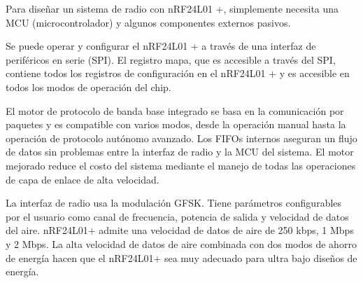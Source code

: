 		\par 
			Para diseñar un sistema de radio con nRF24L01 +, simplemente necesita una MCU (microcontrolador) y algunos componentes externos pasivos.
			
		\par 
			Se puede operar y configurar el nRF24L01 + a través de una interfaz de periféricos en serie (SPI). El registro
			mapa, que es accesible a través del SPI, contiene todos los registros de configuración en el nRF24L01 + y es
			accesible en todos los modos de operación del chip.
			
		\par 
			El motor de protocolo de banda base integrado se basa en la comunicación por paquetes
			y es compatible con varios modos, desde la operación manual hasta la operación de protocolo autónomo avanzado. 
			Los FIFOs internos aseguran un flujo de datos sin problemas entre la interfaz de radio y la MCU del sistema. El motor mejorado reduce el costo del sistema mediante el manejo de todas las operaciones de capa de enlace de alta velocidad.
			
		\par 
			La interfaz de radio usa la modulación GFSK. Tiene parámetros configurables por el usuario como canal de frecuencia,
			potencia de salida y velocidad de datos del aire. nRF24L01+ admite una velocidad de datos de aire de 250 kbps, 1 Mbps y 2 Mbps.
			La alta velocidad de datos de aire combinada con dos modos de ahorro de energía hacen que el nRF24L01+ sea muy adecuado para ultra bajo
			diseños de energía.